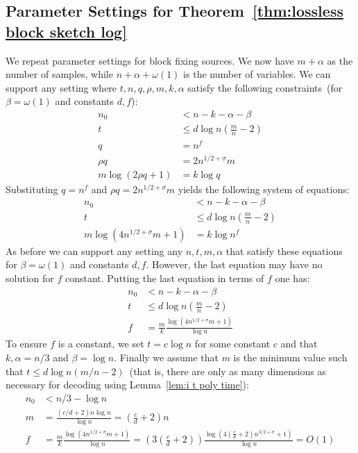 \documentclass[11pt]{article}
\newcommand{\thref}[1]{\mbox{Theorem~\ref{#1}}}
\newcommand{\lemref}[1]{\mbox{Lemma~\ref{#1}}}
\begin{document}
\subsection{Parameter Settings for \thref{thm:lossless block sketch log}}
\label{ssec:block params}
We repeat parameter settings for block fixing sources.  We now have $m+\alpha$ as the number of samples, while $n + \alpha+\omega(1)$ is the number of variables.  We can support any setting where $t, n, q, \rho, m, k, \alpha$ satisfy the following constraints~(for $\beta = \omega(1)$ and constants $d, f$):
\begin{align*}
n_0&< n -k  -\alpha -\beta\\
t&\leq d \log n\left(\frac{m}{n}-2\right)\\
q &= n^f\\
\rho q  &= 2n^{1/2+\sigma}m\\
m\log (2\rho q+1)&= k \log q
\end{align*}
Substituting $q = n^f$ and $\rho q = 2n^{1/2+\sigma}m$ yields the following system of equations:
\begin{align*}
n_0&< n - k - \alpha -\beta\\
t&\leq d\log n\left(\frac{m}{n}-2\right)\\
m \log (4n^{1/2+\sigma}m +1)&= k \log n^f
\end{align*}
As before we can support any setting any $n, t, m, \alpha$ that satisfy these equations for $\beta = \omega(1)$ and constants $d, f$.  However, the last equation may have no solution for $f$ constant.  Putting the last equation in terms of $f$ one has:
\begin{align*}
n_0&< n -k  - \alpha - \beta \\
t&\leq d\log n\left(\frac{ m }{n} -2\right)\\
f &= \frac{m}{k}\frac{\log (4n^{1/2+\sigma} m+1)}{\log n}
\end{align*}
To ensure $f$ is a constant, we set $t = c \log n$ for some constant $c$ and that $k, \alpha = n/3$ and $\beta = \log n$.  Finally we assume that $m$ is the minimum value such that $t \leq  d \log n(m/n-2)$~(that is, there are only as many dimensions as necessary for decoding using \lemref{lem:i t poly time}):
\begin{align*}
n_0&< n/3 -  \log n\\
m &= \frac{(c/d+2)n \log n}{ \log n} = (\frac{c}{d}+2)n\\
f &= \frac{m}{k}\frac{\log (4n^{1/2+\sigma}m+1)}{\log n} = \left(3(\frac{c}{d}+2)\right)\frac{\log (4(\frac{c}{d}+2) n^{3/2+\sigma}+1)}{\log n} = O(1)
\end{align*}
\end{document}
